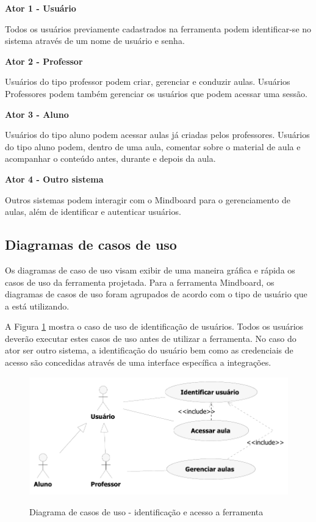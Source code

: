 \textbf{Ator 1 - Usuário}

Todos os usuários previamente cadastrados na ferramenta podem identificar-se no sistema através de um nome de usuário e senha.

\textbf{Ator 2 - Professor}

Usuários do tipo professor podem criar, gerenciar e conduzir aulas. Usuários Professores podem também gerenciar os usuários que podem acessar uma sessão.

\textbf{Ator 3 - Aluno}

Usuários do tipo aluno podem acessar aulas já criadas pelos professores. Usuários do tipo aluno podem, dentro de uma aula, comentar sobre o material de aula e acompanhar o conteúdo antes, durante e depois da aula.

\textbf{Ator 4 - Outro sistema}

Outros sistemas podem interagir com o Mindboard para o gerenciamento de aulas, além de identificar e autenticar usuários.

\subsection{Diagramas de casos de uso}

Os diagramas de caso de uso visam exibir de uma maneira gráfica e rápida os casos de uso da ferramenta projetada. Para a ferramenta Mindboard, os diagramas de casos de uso foram agrupados de acordo com o tipo de usuário que a está utilizando. 

A Figura \ref{fig:use_case1} mostra o caso de uso de identificação de usuários. Todos os usuários deverão executar estes casos de uso antes de utilizar a ferramenta. No caso do ator ser outro sistema, a identificação do usuário bem como as credenciais de acesso são concedidas através de uma interface específica a integrações.
 
\begin{figure}[!h]
\centering
\caption{Diagrama de casos de uso - identificação e acesso a ferramenta}
\includegraphics[width=1.0\textwidth]{pdfs/img-use-case1.pdf} 
\label{fig:use_case1} 
\end{figure}

